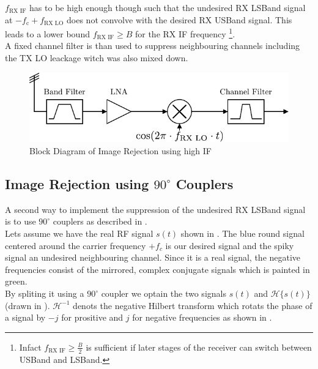 $f_{\text{RX IF}}$ has to be high enough though such that the undesired
\gls{RX} \gls{LSBand} signal at $-f_{\text{c}} + f_{\text{RX LO}}$
does not convolve with the desired \gls{RX} \gls{USBand} signal.
This leads to a lower bound
$f_{\text{RX IF}} \geq B$ for the \gls{RX} \gls{IF} frequency
\footnote{%
  Infact $f_{\text{RX IF}} \geq \frac{B}{2}$
  is sufficient if later stages of the receiver can switch
  between \gls{USBand} and \gls{LSBand}.}. \\

A fixed channel filter is than used to suppress neighbouring channels
including the \gls{TX} \gls{LO} leackage witch was also mixed down. \\

\begin{figure}[ht]
  \centering
  \includegraphics[width=\textwidth]{figures/rx_rf_0_bd}
  \caption{Block Diagram of Image Rejection using high \gls{IF}}
  \label{fig:rx_rf_0_bd}
\end{figure}

\subsection{Image Rejection using $90^\circ$ Couplers}
A second way to implement the suppression of the undesired \gls{RX}
\gls{LSBand} signal is to use $90^\circ$ couplers as described in
. \\

Lets assume we have the real \gls{RF} signal $s(t)$ shown in
.
The blue round signal centered around the carrier frequency $+f_c$ is our
desired signal and the spiky signal an undesired neighbouring channel.
Since it is a real signal, the negative frequencies consist of the mirrored,
complex conjugate signals which is painted in green. \\

By spliting it using a $90^\circ$ coupler we optain the two signals
$s(t)$ and $\mathcal{H}\{s(t)\}$ (drawn in ).
$\mathcal{H}^{-1}$ denots the negative Hilbert transform which rotats the phase
of a signal by $-j$ for prositive and $j$ for negative frequencies
as shown in . \\

